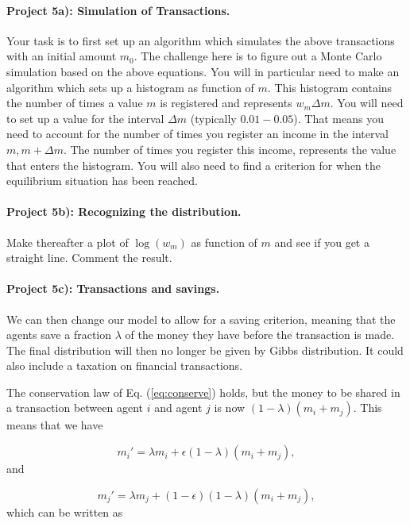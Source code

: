 \documentclass[%
oneside,                 %
final,                   %
10pt]{article}
\begin{document}
\paragraph{Project 5a): Simulation of Transactions.}
Your task is to first set up an algorithm which simulates the above transactions with an initial
  amount $m_0$.
  The challenge here is to figure out a Monte Carlo  simulation  based on the
  above equations.
  You will in particular need to make an algorithm which sets up a histogram as function of $m$.
  This histogram contains the number of times a value $m$ is registered and represents
  $w_m\Delta m$. You will need to set up a value for the interval $\Delta m$  (typically $0.01-0.05$).
  That means you need to account for the number of times you register an income in the interval
  $m,m+\Delta m$. The number of times you register this income, represents the value that enters the histogram.
  You will also need to find a criterion for when the equilibrium situation has been reached.

\paragraph{Project 5b): Recognizing the distribution.}
Make thereafter a plot of  $\log{(w_m)}$ as function of $m$
  and see if you get a straight line.
  Comment the result.

\paragraph{Project 5c): Transactions and savings.}
We can then change our model to allow for a saving criterion, meaning that the agents save
  a fraction $\lambda$ of the money they have before the transaction is made. The final distribution will then no longer be given by Gibbs distribution. It could also include a taxation on financial transactions.

  The conservation law of Eq. (\ref{eq:conserve}) holds, but the money to be shared in a transaction between
  agent $i$ and agent $j$ is now $(1-\lambda)(m_i+m_j)$. This means that we have

\begin{equation*}
  m_i' = \lambda m_i+\epsilon(1-\lambda)(m_i+m_j),
  \end{equation*}
  and

\begin{equation*}
  m_j' = \lambda m_j+(1-\epsilon)(1-\lambda)(m_i+m_j),
  \end{equation*}
  which can be written as
\end{document}
